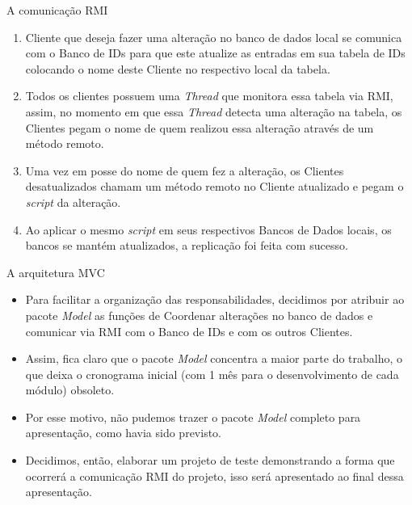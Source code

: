 \documentclass[10pt,brazil]{beamer}
\begin{document}
\begin{frame}{A comunicação RMI}


{\small
		\begin{enumerate}
			\item Cliente que deseja fazer uma alteração no banco de dados local se comunica com o Banco de IDs para que este atualize as entradas em sua tabela de IDs colocando o nome deste Cliente no respectivo local da tabela.

			\item Todos os clientes possuem uma \emph{Thread} que monitora essa tabela via RMI, assim, no momento em que essa \emph{Thread} detecta uma alteração na tabela, os Clientes pegam o nome de quem realizou essa alteração através de um método remoto. 

			\item Uma vez em posse do nome de quem fez a alteração, os Clientes desatualizados chamam um método remoto no Cliente atualizado e pegam o \emph{script} da alteração.

			\item Ao aplicar o mesmo \emph{script} em seus respectivos Bancos de Dados locais, os bancos se mantém atualizados, a replicação foi feita com sucesso.
		\end{enumerate}
		}
\end{frame}


\begin{frame}{A arquitetura MVC}
	\begin{itemize}
	 \item Para facilitar a organização das responsabilidades, decidimos por atribuir ao pacote \emph{Model} as funções de Coordenar alterações no banco de dados e comunicar via RMI com o Banco de IDs e com os outros Clientes.
	 \item Assim, fica claro que o pacote \emph{Model} concentra a maior parte do trabalho, o que deixa o cronograma inicial (com 1 mês para o desenvolvimento de cada módulo) obsoleto.
	 \item Por esse motivo, não pudemos trazer o pacote \emph{Model} completo para apresentação, como havia sido previsto.
	 \item Decidimos, então, elaborar um projeto de teste demonstrando a forma que ocorrerá a comunicação RMI do projeto, isso será apresentado ao final dessa apresentação.
	\end{itemize}
\end{frame}
\end{document}
